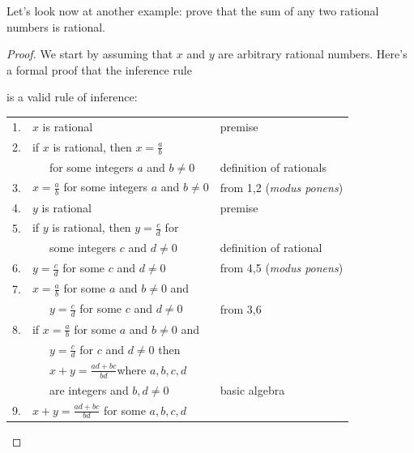 \medskip

Let's look now at another example: prove that the sum of any two rational numbers is
rational. 
\begin{proof}
We start by assuming that $x$ and $y$ are arbitrary rational numbers.
Here's a formal proof that the inference rule
\begin{center}
\end{center}
is a valid rule of inference:

\breakSixByNine

\begin{center}
\begin{tabular}{r@{\ \ }l@{\qquad}l}
1.&$x$ is rational                                                 & premise\\
2.&if $x$ is rational, then $x=\frac{a}{b}$                        & \\
  & \ \ \ for some integers $a$ and $b\not=0$                      & definition of rationals \\
3.&$x=\frac{a}{b}$ for some integers $a$ and $b\not=0$             & from 1,2 (\textit{modus ponens}) \\
4.&$y$ is rational                                                 & premise\\
5.&if $y$ is rational, then $y=\frac{c}{d}$ for                    & \\
  & \ \ \ some integers $c$ and $d\not=0$                          & definition of rational\\
6.&$y=\frac{c}{d}$ for some $c$ and $d\not=0$                      & from 4,5 (\textit{modus ponens})\\
7.&$x=\frac{a}{b}$ for some $a$ and $b\not=0$ and                  & \\
  & \ \ \ $y=\frac{c}{d}$ for some $c$ and $d\not=0$               & from 3,6\\
8.&if $x=\frac{a}{b}$ for some $a$ and $b\not=0$ and               & \\
  & \ \ \ $y=\frac{c}{d}$ for $c$ and $d\not=0$ then               & \\
  & \ \ \ $x+y = \frac{ad+bc}{bd}$where $a,b,c,d$                  & \\
  & \ \ \ are integers and $b,d \not=0$                            & basic algebra\\
9.&$x+y = \frac{ad+bc}{bd}$ for some $a,b,c,d$                     & \\

\end{tabular}
\end{center}
\end{proof}

